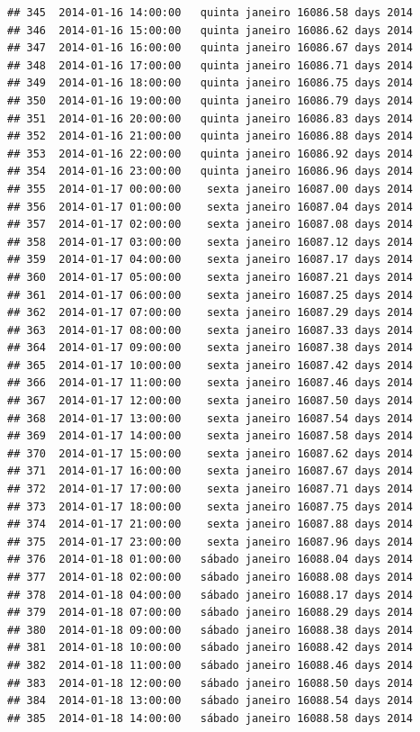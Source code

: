 \documentclass[]{book}
\begin{document}
\begin{verbatim}
## 345  2014-01-16 14:00:00   quinta janeiro 16086.58 days 2014
## 346  2014-01-16 15:00:00   quinta janeiro 16086.62 days 2014
## 347  2014-01-16 16:00:00   quinta janeiro 16086.67 days 2014
## 348  2014-01-16 17:00:00   quinta janeiro 16086.71 days 2014
## 349  2014-01-16 18:00:00   quinta janeiro 16086.75 days 2014
## 350  2014-01-16 19:00:00   quinta janeiro 16086.79 days 2014
## 351  2014-01-16 20:00:00   quinta janeiro 16086.83 days 2014
## 352  2014-01-16 21:00:00   quinta janeiro 16086.88 days 2014
## 353  2014-01-16 22:00:00   quinta janeiro 16086.92 days 2014
## 354  2014-01-16 23:00:00   quinta janeiro 16086.96 days 2014
## 355  2014-01-17 00:00:00    sexta janeiro 16087.00 days 2014
## 356  2014-01-17 01:00:00    sexta janeiro 16087.04 days 2014
## 357  2014-01-17 02:00:00    sexta janeiro 16087.08 days 2014
## 358  2014-01-17 03:00:00    sexta janeiro 16087.12 days 2014
## 359  2014-01-17 04:00:00    sexta janeiro 16087.17 days 2014
## 360  2014-01-17 05:00:00    sexta janeiro 16087.21 days 2014
## 361  2014-01-17 06:00:00    sexta janeiro 16087.25 days 2014
## 362  2014-01-17 07:00:00    sexta janeiro 16087.29 days 2014
## 363  2014-01-17 08:00:00    sexta janeiro 16087.33 days 2014
## 364  2014-01-17 09:00:00    sexta janeiro 16087.38 days 2014
## 365  2014-01-17 10:00:00    sexta janeiro 16087.42 days 2014
## 366  2014-01-17 11:00:00    sexta janeiro 16087.46 days 2014
## 367  2014-01-17 12:00:00    sexta janeiro 16087.50 days 2014
## 368  2014-01-17 13:00:00    sexta janeiro 16087.54 days 2014
## 369  2014-01-17 14:00:00    sexta janeiro 16087.58 days 2014
## 370  2014-01-17 15:00:00    sexta janeiro 16087.62 days 2014
## 371  2014-01-17 16:00:00    sexta janeiro 16087.67 days 2014
## 372  2014-01-17 17:00:00    sexta janeiro 16087.71 days 2014
## 373  2014-01-17 18:00:00    sexta janeiro 16087.75 days 2014
## 374  2014-01-17 21:00:00    sexta janeiro 16087.88 days 2014
## 375  2014-01-17 23:00:00    sexta janeiro 16087.96 days 2014
## 376  2014-01-18 01:00:00   sábado janeiro 16088.04 days 2014
## 377  2014-01-18 02:00:00   sábado janeiro 16088.08 days 2014
## 378  2014-01-18 04:00:00   sábado janeiro 16088.17 days 2014
## 379  2014-01-18 07:00:00   sábado janeiro 16088.29 days 2014
## 380  2014-01-18 09:00:00   sábado janeiro 16088.38 days 2014
## 381  2014-01-18 10:00:00   sábado janeiro 16088.42 days 2014
## 382  2014-01-18 11:00:00   sábado janeiro 16088.46 days 2014
## 383  2014-01-18 12:00:00   sábado janeiro 16088.50 days 2014
## 384  2014-01-18 13:00:00   sábado janeiro 16088.54 days 2014
## 385  2014-01-18 14:00:00   sábado janeiro 16088.58 days 2014

\end{verbatim}
\end{document}
